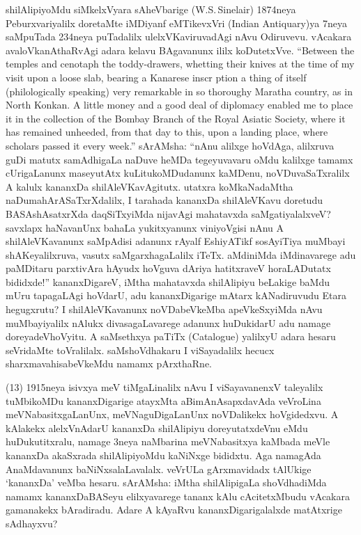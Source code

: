 \documentclass[11pt,a4size]{article}
\begin{document}
shilAlipiyoMdu siMkelxVyara sAheVbarige {\rm
    (W.S.\,Sinelair)} 1874neya Peburxvariyalilx doretaMte iMDiyanf
eMTikevxVri {\rm (Indian Antiquary)}ya 7neya saMpuTada
234neya puTadalilx ulelxVKaviruvadAgi nAvu Odiruvevu. vAcakara
avaloVkanAthaRvAgi adara kelavu BAgavanunx ililx
koDutetxVve. ``{\rm Between the temples and cenotaph the
    toddy-drawers, whetting their knives at the time of my visit upon a
    loose slab, bearing a Kanarese inscr ption a thing of itself
    (philologically speaking) very remarkable in so thoroughy Maratha
    country, as in North Konkan. A little money and a good deal of
    diplomacy enabled me to place it in the collection of the Bombay
    Branch of the Royal Asiatic Society, where it has remained
    unheeded, from that day to this, upon a landing place, where
    scholars passed it every week.}'' sArAMsha: ``nAnu alilxge
hoVdAga, alilxruva guDi matutx samAdhigaLa naDuve heMDa tegeyuvavaru
oMdu kalilxge tamamx cUrigaLanunx maseyutAtx kuLitukoMDudanunx
kaMDenu, noVDuvaSaTxralilx A kalulx kananxDa
shilAleVKavAgitutx. utatxra koMkaNadaMtha naDumahArASaTxrXdalilx, I
tarahada kananxDa shilAleVKavu doretudu BASAshAsatxrXda daqSiTxyiMda
nijavAgi mahatavxda saMgatiyalalxveV? savxlapx haNavanUnx bahaLa
yukitxyanunx viniyoVgisi nAnu A shilAleVKavanunx saMpAdisi adanunx
rAyalf EshiyATikf sosAyiTiya muMbayi shAKeyalilxruva, vasutx
saMgarxhagaLalilx iTeTx. aMdiniMda iMdinavarege adu paMDitaru
parxtivAra hAyudx hoVguva dAriya hatitxraveV horaLADutatx bididxde!''
kananxDigareV, iMtha mahatavxda shilAlipiyu beLakige baMdu mUru
tapagaLAgi hoVdarU, adu kananxDigarige mAtarx kANadiruvudu Etara
hegugxrutu? I shilAleVKavanunx noVDabeVkeMba apeVkeSxyiMda nAvu
muMbayiyalilx nAlukx divasagaLavarege adanunx huDukidarU adu namage
doreyadeVhoVyitu. A saMsethxya paTiTx {\rm (Catalogue)}
yalilxyU adara hesaru seVridaMte toVralilalx. saMshoVdhakaru I
viSayadalilx hecucx sharxmavahisabeVkeMdu namamx pArxthaRne.

(13) 1915neya isivxya meV tiMgaLinalilx nAvu I viSayavanenxV
     taleyalilx tuMbikoMDu kananxDigarige atayxMta aBimAnAsapxdavAda
     veVroLina meVNabasitxgaLanUnx, meVNaguDigaLanUnx noVDalikekx
     hoVgidedxvu. A kAlakekx alelxVnAdarU kananxDa shilAlipiyu
     doreyutatxdeVnu eMdu huDukutitxralu, namage 3neya naMbarina
     meVNabasitxya kaMbada meVle kananxDa akaSxrada shilAlipiyoMdu
     kaNiNxge bididxtu. Aga namagAda AnaMdavanunx
     baNiNxsalaLavalalx. veVrULa gArxmavidadx tAlUkige `kananxDa'
     veMba hesaru. sArAMsha: iMtha shilAlipigaLa shoVdhadiMda namamx
     kananxDaBASeyu elilxyavarege tananx kAlu cAcitetxMbudu vAcakara
     gamanakekx bAradiradu. Adare A kAyaRvu kananxDigarigalalxde
     matAtxrige sAdhayxvu?
\end{document}
